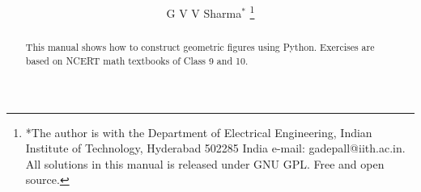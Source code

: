 \documentclass[journal,12pt,twocolumn]{IEEEtran}
\renewcommand\thesection{\arabic{section}}
\begin{document}
\let\StandardTheFigure\thefigure
\renewcommand{\thefigure}{\thesection}



\makeatletter
{}
\makeatother

\let\StandardTheFigure\thefigure
\let\StandardTheTable\thetable
\let\vec\mathbf





\def\putbox#1#2#3{\makebox[0in][l]{\makebox[#1][l]{}\raisebox{\baselineskip}[0in][0in]{\raisebox{#2}[0in][0in]{#3}}}}
     \def\rightbox#1{\makebox[0in][r]{#1}}
     \def\centbox#1{\makebox[0in]{#1}}
     \def\topbox#1{\raisebox{-\baselineskip}[0in][0in]{#1}}
     \def\midbox#1{\raisebox{-0.5\baselineskip}[0in][0in]{#1}}

\vspace{3cm}

\title{ 
}

\author{ G V V Sharma$^{*}$%
	\thanks{*The author is with the Department
		of Electrical Engineering, Indian Institute of Technology, Hyderabad
		502285 India e-mail:  gadepall@iith.ac.in. All solutions in this manual is released under GNU 
GPL.  Free and open source.}
	
}	

\maketitle

\tableofcontents

\bigskip

\renewcommand{\thefigure}{\theenumi}
\renewcommand{\thetable}{\theenumi}

\begin{abstract}
This manual shows how to construct geometric figures using Python. Exercises are based on  NCERT math textbooks of Class 9 and 10.
\end{abstract}
\end{document}
